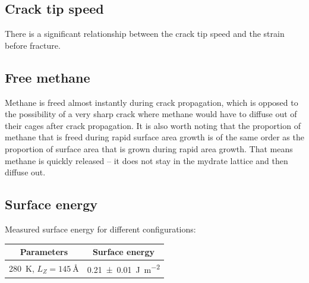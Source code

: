 \subsection{Crack tip speed}
There is a significant relationship between the crack tip speed and the strain before fracture. 

\subsection{Free methane}
Methane is freed almost instantly during crack propagation, which is opposed to the possibility of a very sharp crack where methane would have to diffuse out of their cages after crack propagation. It is also worth noting that the proportion of methane that is freed during rapid surface area growth is of the same order as the proportion of surface area that is grown during rapid area growth. That means methane is quickly released -- it does not stay in the mydrate lattice and then diffuse out.


\subsection{Surface energy}
Measured surface energy for different configurations:

\begin{table}
\centering
\begin{tabular}{c|c}
Parameters & Surface energy \\
\hline
\SI{280}{\kelvin}, $L_Z = \SI{145}{\angstrom}$ & \SI{0.21 \pm 0.01}{\joule\per\meter\squared}
\end{tabular}
\end{table}

